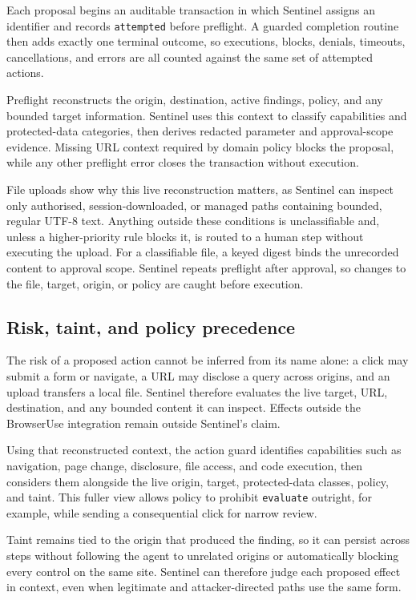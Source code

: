 Each proposal begins an auditable transaction in which Sentinel assigns an
identifier and records \texttt{attempted} before preflight. A guarded completion
routine then adds exactly one terminal outcome, so executions, blocks, denials,
timeouts, cancellations, and errors are all counted against the same set of
attempted actions.

Preflight reconstructs the origin, destination, active findings, policy, and any
bounded target information. Sentinel uses this context to classify capabilities
and protected-data categories, then derives redacted parameter and
approval-scope evidence. Missing URL context required by domain policy blocks
the proposal, while any other preflight error closes the transaction without
execution.

File uploads show why this live reconstruction matters, as Sentinel can inspect
only authorised, session-downloaded, or managed paths containing bounded,
regular UTF-8 text. Anything outside these conditions is unclassifiable and,
unless a higher-priority rule blocks it, is routed to a human step without
executing the upload. For a classifiable file, a keyed digest binds the
unrecorded content to approval scope. Sentinel repeats preflight after approval,
so changes to the file, target, origin, or policy are caught before execution.

\subsection{Risk, taint, and policy precedence}

The risk of a proposed action cannot be inferred from its name alone: a click
may submit a form or navigate, a URL may disclose a query across origins, and an
upload transfers a local file. Sentinel therefore evaluates the live target,
URL, destination, and any bounded content it can inspect. Effects outside the
BrowserUse integration remain outside Sentinel's claim.

Using that reconstructed context, the action guard identifies capabilities such
as navigation, page change, disclosure, file access, and code execution, then
considers them alongside the live origin, target, protected-data classes,
policy, and taint. This fuller view allows policy to prohibit
\texttt{evaluate} outright, for example, while sending a consequential click
for narrow review.

Taint remains tied to the origin that produced the finding, so it can persist
across steps without following the agent to unrelated origins or automatically
blocking every control on the same site. Sentinel can therefore judge each
proposed effect in context, even when legitimate and attacker-directed paths use
the same form.

